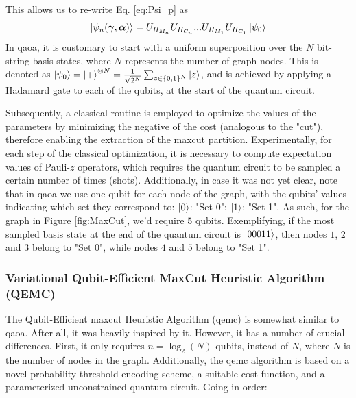 \noindent This allows us to re-write Eq. \ref{eq:Psi_p} as
\begin{equation}
     \ket{\psi_n(\boldsymbol{\gamma}, \boldsymbol{\alpha})} = U_{H_{M_n}}U_{H_{C_n}} ... U_{H_{M_1}}U_{H_{C_1}}\ket{\psi_0}
\end{equation}
In \acrshort{qaoa}, it is customary to start with a uniform superposition over the $N$ bit-string basis states, where $N$ represents the number of graph nodes. This is denoted as $\ket{\psi_0} = \ket{+}^{\otimes N}=\frac{1}{\sqrt{2^{N}}}\sum_{z\in\{0,1\}^{N}}\ket{z}$, and is achieved by applying a Hadamard gate to each of the qubits, at the start of the quantum circuit.

Subsequently, a classical routine is employed to optimize the values of the parameters by minimizing the negative of the cost (analogous to the "cut"), therefore enabling the extraction of the \acrshort{maxcut} partition. Experimentally, for each step of the classical optimization, it is necessary to compute expectation values of Pauli-$z$ operators, which requires the quantum circuit to be sampled a certain number of times (shots). Additionally, in case it was not yet clear, note that in \acrshort{qaoa} we use one qubit for each node of the graph, with the qubits' values indicating which set they correspond to: $\ket{0}$: "Set 0"; $\ket{1}$: "Set 1". As such, for the graph in Figure \ref{fig:MaxCut}, we'd require $5$ qubits. Exemplifying, if the most sampled basis state at the end of the quantum circuit is $\ket{00011}$, then nodes $1$, $2$ and $3$ belong to "Set 0", while nodes $4$ and $5$ belong to "Set 1".


\subsubsection{Variational Qubit-Efficient MaxCut Heuristic Algorithm (QEMC)}
\label{subsubsection:QEMC}


The Qubit-Efficient \acrshort{maxcut} Heuristic Algorithm (\acrshort{qemc}) \cite{tenecohen2023variational} is somewhat similar to \acrshort{qaoa}. After all, it was heavily inspired by it. However, it has a number of crucial differences. First, it only requires $n = \log_2(N)$ qubits, instead of $N$, where $N$ is the number of nodes in the graph. Additionally, the \acrshort{qemc} algorithm is based on a novel probability threshold encoding scheme, a suitable cost function, and a parameterized unconstrained quantum circuit. Going in order:

